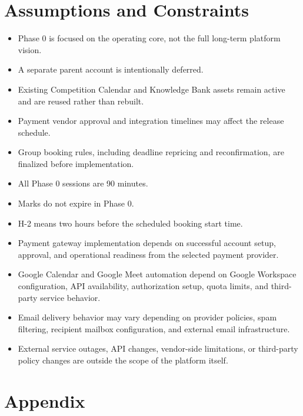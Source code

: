 \documentclass[11pt,a4paper]{article}
\begin{document}
\section{Assumptions and Constraints}

\begin{itemize}
	\item Phase 0 is focused on the operating core, not the full long-term platform vision.
	\item A separate parent account is intentionally deferred.
	\item Existing Competition Calendar and Knowledge Bank assets remain active and are reused rather than rebuilt.
	\item Payment vendor approval and integration timelines may affect the release schedule.
	\item Group booking rules, including deadline repricing and reconfirmation, are finalized before implementation.
	\item All Phase 0 sessions are 90 minutes.
	\item Marks do not expire in Phase 0.
	\item H-2 means two hours before the scheduled booking start time.
	\item Payment gateway implementation depends on successful account setup, approval, and operational readiness from the selected payment provider.
  \item Google Calendar and Google Meet automation depend on Google Workspace configuration, API availability, authorization setup, quota limits, and third-party service behavior.
  \item Email delivery behavior may vary depending on provider policies, spam filtering, recipient mailbox configuration, and external email infrastructure.
  \item External service outages, API changes, vendor-side limitations, or third-party policy changes are outside the scope of the platform itself.
\end{itemize}

\section{Appendix}
\end{document}
